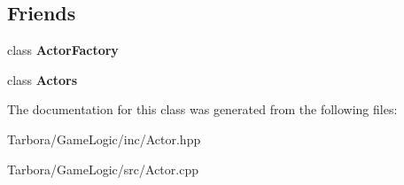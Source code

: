 \subsection*{Friends}
\begin{DoxyCompactItemize}
\item 
\mbox{\label{classTarbora_1_1ActorTest_a6ab97c7737ba5ca6e4cb3a4621c48421}} 
class {\bfseries Actor\+Factory}
\item 
\mbox{\label{classTarbora_1_1ActorTest_ae2bbe52c24cb66e52b1c2066fe9eccc9}} 
class {\bfseries Actors}
\end{DoxyCompactItemize}


The documentation for this class was generated from the following files\+:\begin{DoxyCompactItemize}
\item 
Tarbora/\+Game\+Logic/inc/Actor.\+hpp\item 
Tarbora/\+Game\+Logic/src/Actor.\+cpp\end{DoxyCompactItemize}

